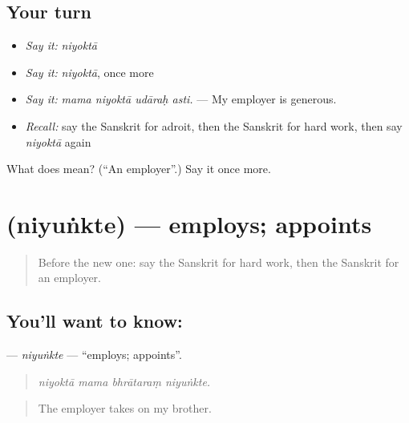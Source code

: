 \subsection*{Your turn}
\begin{itemize}
\raggedright
  \item \emph{Say it:} \emph{niyoktā}
  \item \emph{Say it:} \emph{niyoktā}, once more
  \item \emph{Say it:} \emph{mama niyoktā udāraḥ asti.} — My employer is generous.
  \item \emph{Recall:} say the Sanskrit for adroit, then the Sanskrit for hard work, then say \emph{niyoktā} again
\end{itemize}

\begin{tcolorbox}[breakable,colback=teal!4,colframe=teal!35!black,title={Before you move on}]
What does  mean? (\textquotedblleft{}An employer\textquotedblright{}.) Say it once more.
\end{tcolorbox}
\section[\texorpdfstring{\sk{नियुंक्ते} (niyuṅkte)}{नियुंक्ते (niyuṅkte)}]{ (niyuṅkte) — employs; appoints}

\label{lesson:SA-C503-niyunkte}



\begin{quote}
Before the new one: say the Sanskrit for hard work, then the Sanskrit for an employer.
\end{quote}

\subsection*{You'll want to know: }
\textbf{} — \emph{niyuṅkte} — \textquotedblleft{}employs; appoints\textquotedblright{}.

\begin{quote}
   
\end{quote}

\begin{quote}
\emph{niyoktā mama bhrātaraṃ niyuṅkte.}
\end{quote}

\begin{quote}
The employer takes on my brother.
\end{quote}

